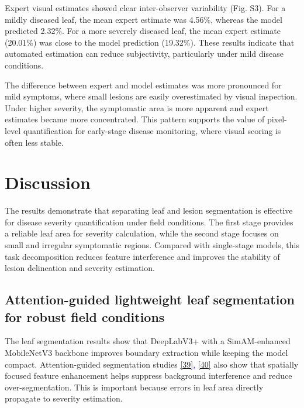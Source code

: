 \documentclass[
]{article}
\begin{document}
Expert visual estimates showed clear inter-observer variability (Fig.
S3). For a mildly diseased leaf, the mean expert estimate was 4.56\%,
whereas the model predicted 2.32\%. For a more severely diseased leaf,
the mean expert estimate (20.01\%) was close to the model prediction
(19.32\%). These results indicate that automated estimation can reduce
subjectivity, particularly under mild disease conditions.

The difference between expert and model estimates was more pronounced
for mild symptoms, where small lesions are easily overestimated by visual
inspection. Under higher severity, the symptomatic area is more apparent
and expert estimates became more concentrated. This pattern supports the
value of pixel-level quantification for early-stage disease monitoring,
where visual scoring is often less stable.

\hypertarget{discussion}{%
\section{Discussion}\label{discussion}}

The results demonstrate that separating leaf and lesion segmentation is
effective for disease severity quantification under field conditions.
The first stage provides a reliable leaf area for severity calculation,
while the second stage focuses on small and irregular symptomatic
regions. Compared with single-stage models, this task decomposition
reduces feature interference and improves the stability of lesion
delineation and severity estimation.

\hypertarget{attention-guided-lightweight-leaf-segmentation-for-robust-field-conditions}{%
\subsection{Attention-guided lightweight leaf segmentation for robust field
conditions}\label{attention-guided-lightweight-leaf-segmentation-for-robust-field-conditions}}

The leaf segmentation results show that DeepLabV3+ with a
SimAM-enhanced MobileNetV3 backbone improves boundary extraction while
keeping the model compact. Attention-guided segmentation studies
\textcolor{blue}{\hyperlink{ref:39}{[39]}, \hyperlink{ref:40}{[40]}} also
show that spatially focused feature enhancement helps suppress
background interference and reduce over-segmentation. This is important because errors in leaf area
directly propagate to severity estimation.
\end{document}
